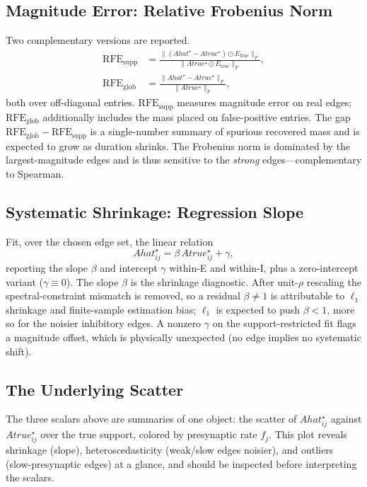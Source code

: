 \documentclass[11pt]{article}
\newcommand{\Etrue}{E_{\mathrm{true}}}
\begin{document}
\subsection{Magnitude Error: Relative Frobenius Norm}
Two complementary versions are reported.
\begin{align}
  \mathrm{RFE}_{\mathrm{supp}}
  &= \frac{\bigl\|(Ahat^{\star}-Atrue^{\star})\odot \Etrue\bigr\|_F}
          {\bigl\|Atrue^{\star}\odot \Etrue\bigr\|_F}, \\[4pt]
  \mathrm{RFE}_{\mathrm{glob}}
  &= \frac{\bigl\|Ahat^{\star}-Atrue^{\star}\bigr\|_F}
          {\bigl\|Atrue^{\star}\bigr\|_F},
\end{align}
both over off-diagonal entries. $\mathrm{RFE}_{\mathrm{supp}}$ measures
magnitude error on real edges; $\mathrm{RFE}_{\mathrm{glob}}$ additionally
includes the mass placed on false-positive entries. The gap
$\mathrm{RFE}_{\mathrm{glob}}-\mathrm{RFE}_{\mathrm{supp}}$ is a single-number
summary of spurious recovered mass and is expected to grow as duration shrinks.
The Frobenius norm is dominated by the largest-magnitude edges and is thus
sensitive to the \emph{strong} edges---complementary to Spearman.

\subsection{Systematic Shrinkage: Regression Slope}
Fit, over the chosen edge set, the linear relation
\begin{equation}
  Ahat^{\star}_{ij} = \beta\,Atrue^{\star}_{ij} + \gamma,
\end{equation}
reporting the slope $\beta$ and intercept $\gamma$ within-E and within-I, plus a
zero-intercept variant ($\gamma\equiv 0$). The slope $\beta$ is the shrinkage
diagnostic. After unit-$\rho$ rescaling the spectral-constraint mismatch is
removed, so a residual $\beta\neq 1$ is attributable to $\ell_1$ shrinkage and
finite-sample estimation bias; $\ell_1$ is expected to push $\beta<1$, more so
for the noisier inhibitory edges. A nonzero $\gamma$ on the support-restricted
fit flags a magnitude offset, which is physically unexpected (no edge implies
no systematic shift).

\subsection{The Underlying Scatter}
The three scalars above are summaries of one object: the scatter of
$Ahat^{\star}_{ij}$ against $Atrue^{\star}_{ij}$ over the true support,
colored by presynaptic rate $f_j$. This plot reveals shrinkage (slope),
heteroscedasticity (weak/slow edges noisier), and outliers (slow-presynaptic
edges) at a glance, and should be inspected before interpreting the scalars.
\end{document}
